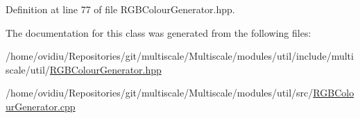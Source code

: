 \-Definition at line 77 of file \-R\-G\-B\-Colour\-Generator.\-hpp.



\-The documentation for this class was generated from the following files\-:\begin{DoxyCompactItemize}
\item 
/home/ovidiu/\-Repositories/git/multiscale/\-Multiscale/modules/util/include/multiscale/util/\hyperlink{RGBColourGenerator_8hpp}{\-R\-G\-B\-Colour\-Generator.\-hpp}\item 
/home/ovidiu/\-Repositories/git/multiscale/\-Multiscale/modules/util/src/\hyperlink{RGBColourGenerator_8cpp}{\-R\-G\-B\-Colour\-Generator.\-cpp}\end{DoxyCompactItemize}
